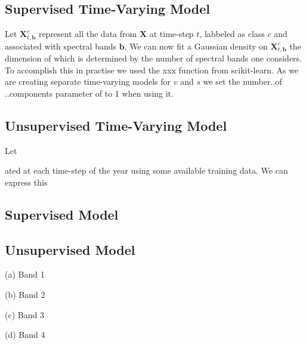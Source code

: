 \documentclass{article}
\begin{document}
\subsection{Supervised Time-Varying Model}
Let $\mathbf{X}_{t,\mathbf{b}}^c$ represent all the data from $\mathbf{X}$ at time-step $t$, labbeled as class $c$ and associated with spectral bands $\mathbf{b}$. We can now fit a Gaussian density 
on $\mathbf{X}_{t,\mathbf{b}}^c$ the dimension of which is determined by the number of spectral bands one considers. To accomplish this in practise we used the 
xxx function from scikit-learn. As we are creating separate time-varying models for $v$ and $s$ we set the number..of ..components parameter of to 1 when using it.

\subsection{Unsupervised Time-Varying Model}
Let 






ated at each time-step of the year 
using some available training data. We can express this     


\subsection{Supervised Model}

\subsection{Unsupervised Model}

\begin{minipage}[b]{.47\linewidth}
  \centering 
  \centerline{}
  \centerline{(a) Band 1}\medskip
\end{minipage}
\hfill
\begin{minipage}[b]{0.47\linewidth}
  \centering
  \centerline{}
  \centerline{(b) Band 2}\medskip
\end{minipage}

\begin{minipage}[b]{.47\linewidth}
  \centering 
  \centerline{}
  \centerline{(c) Band 3}\medskip
\end{minipage}
\hfill
\begin{minipage}[b]{0.47\linewidth}
  \centering
  \centerline{}
  \centerline{(d) Band 4}\medskip
\end{minipage}
\end{document}

